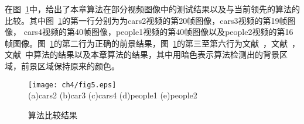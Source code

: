 在图~\ref{ch4:fig:result}中，给出了本章算法在部分视频图像中的测试结果以及与当前领先的算法\cite{kwak2011Generalized,Multitransform,5.8s}的比较。其中图~\ref{ch4:fig:result}的第一行分别为为cars2视频的第20帧图像，cars3视频的第19帧图像， cars4视频的第40帧图像，people1视频的第40帧图像以及people2视频的第16帧图像。图~\ref{ch4:fig:result}的第二行为正确的前景结果，图~\ref{ch4:fig:result}的第三至第六行为文献~，文献~，文献~中算法的结果以及本章算法的结果，其中用暗色表示算法检测出的背景区域，前景区域保持原来的颜色。

\begin{figure}[htb]
\begin{center}
\texttt{[image: ch4/fig5.eps]}\\
(a)cars2 \quad\quad (b)car3 \quad\quad\quad (c)cars4 \quad\quad\quad (d)people1 \quad\quad (e)people2
\end{center}
\caption{算法比较结果}
\label{ch4:fig:result}       %
\end{figure}

